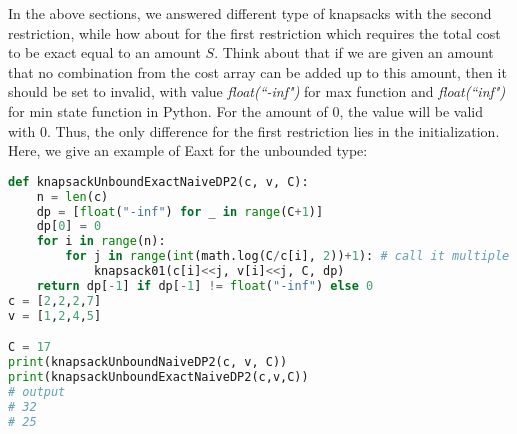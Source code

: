 \documentclass[../main.tex]{subfiles}
\begin{document}
In the above sections, we answered different type of knapsacks with the second restriction, while how about for the first restriction which requires the total cost to be exact equal to an amount $S$. Think about that if we are given an amount that no combination from the cost array can be added up to this amount, then it should be set to invalid, with value \textit{float(``-inf")} for max function and \textit{float(``inf")} for min state function in Python. For the amount of 0, the value will be valid with 0. Thus, the only difference for the first restriction lies in the initialization.  Here, we give an example of Eaxt for the unbounded type:
\begin{lstlisting}[language=Python]
def knapsackUnboundExactNaiveDP2(c, v, C):
    n = len(c)
    dp = [float("-inf") for _ in range(C+1)] 
    dp[0] = 0
    for i in range(n):
        for j in range(int(math.log(C/c[i], 2))+1): # call it multiple times
            knapsack01(c[i]<<j, v[i]<<j, C, dp)
    return dp[-1] if dp[-1] != float("-inf") else 0
c = [2,2,2,7]
v = [1,2,4,5]

C = 17
print(knapsackUnboundNaiveDP2(c, v, C))
print(knapsackUnboundExactNaiveDP2(c,v,C))
# output
# 32
# 25
\end{lstlisting}

\end{document}
